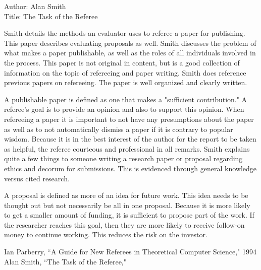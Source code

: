 \documentclass[11pt]{article}
\begin{document}
Author: Alan Smith\\
Title: The Task of the Referee

Smith details the methods an evaluator uses to referee a paper for publishing.  This paper describes evaluating proposals as well.  Smith discusses the problem of what makes a paper publishable, as well as the roles of all individuals involved in the process.  This paper is not original in content, but is a good collection of information on the topic of refereeing and paper writing.  Smith does reference previous papers on refereeing.  The paper is well organized and clearly written.

A publishable paper is defined as one that makes a "sufficient contribution."\cite{ASmith} A referee's goal is to provide an opinion and also to support this opinion.  When refereeing a paper it is important to not have any presumptions about the paper as well as to not automatically dismiss a paper if it is contrary to popular wisdom.  Because it is in the best interest of the author for the report to be taken as helpful, the referee courteous and professional in all remarks.  Smith explains quite a few things to someone writing a research paper or proposal regarding ethics and decorum for submissions.  This is evidenced through general knowledge versus cited research.

A proposal is defined as more of an idea for future work.  This idea needs to be thought out but not necessarily be all in one proposal.  Because it is more likely to get a smaller amount of funding, it is sufficient to propose part of the work.  If the researcher reaches this goal, then they are more likely to receive follow-on money to continue working.  This reduces the risk on the investor.

\begin{thebibliography}{5}
Ian Parberry, ``A Guide for New Referees in Theoretical Computer Science," 1994
Alan Smith, ``The Task of the Referee,"
\end{thebibliography}
\end{document}
